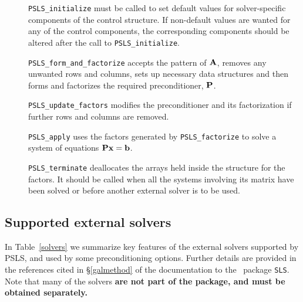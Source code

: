 \documentclass{galahad}
\newcommand{\packagename}{PSLS}
\begin{document}
\begin{description}
\item[] {\tt \packagename\_initialize} must be called to
set default values for solver-specific components of the control structure.
If non-default values are
wanted for any of the control components, the corresponding components
should be altered after the call to {\tt \packagename\_initialize}.

\item[] {\tt \packagename\_form\_and\_factorize} accepts the pattern of ${\mathbf{A}}$,
 removes any unwanted rows and columns, sets up necessary data structures
 and then forms and factorizes the required preconditioner, ${\mathbf{P}}$.

\item[] {\tt \packagename\_update\_factors} modifies the preconditioner and
 its factorization if further rows and columns are removed.

\item[] {\tt \packagename\_apply} uses the factors generated by
  {\tt \packagename\_factorize} to
  solve a system of equations ${\mathbf{P}} {\mathbf{x}} = {\mathbf{b}}$.

\item[] {\tt \packagename\_terminate} deallocates the arrays held inside the
  structure for the factors. It should be called
  when all the systems involving its matrix have been solved
  or before another external solver is to be used.
\end{description}

\subsection{Supported external solvers}

In Table~\ref{solvers} we summarize key features of
the external solvers supported by \packagename, and used
by some preconditioning options. Further details
are provided in the references cited in \S\ref{galmethod} of the
documentation to the \libraryname\ package {\tt SLS}. Note that many
of the solvers {\bf are not part of the package, and must be obtained
separately.}
\end{document}
